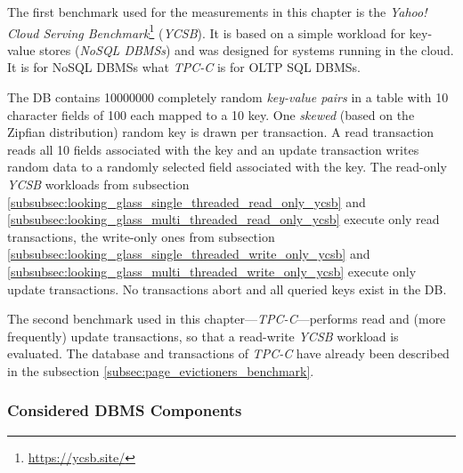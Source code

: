     The first benchmark used for the measurements in this chapter is the \emph{Yahoo! Cloud Serving Benchmark}\footnote{\url{https://ycsb.site/}} (\textit{YCSB}). It is based on a simple workload for key-value stores (\emph{NoSQL DBMSs}) and was designed for systems running in the cloud. It is for NoSQL DBMSs what \textit{TPC-C} is for OLTP SQL DBMSs.

    The DB contains \num{10000000} completely random \emph{key-value pairs} in a table with 10 character fields of \SI{100}{\byte} each mapped to a \SI{10}{\byte} key. One \emph{skewed} (based on the Zipfian distribution) random key is drawn per transaction. A read transaction reads all 10 fields associated with the key and an update transaction writes random data to a randomly selected field associated with the key. The read-only \textit{YCSB} workloads from subsection \ref{subsubsec:looking_glass_single_threaded_read_only_ycsb} and \ref{subsubsec:looking_glass_multi_threaded_read_only_ycsb} execute only read transactions, the write-only ones from subsection \ref{subsubsec:looking_glass_single_threaded_write_only_ycsb} and \ref{subsubsec:looking_glass_multi_threaded_write_only_ycsb} execute only update transactions. No transactions abort and all queried keys exist in the DB.

    The second benchmark used in this chapter---\textit{TPC-C}---performs read and (more frequently) update transactions, so that a read-write \textit{YCSB} workload is evaluated. The database and transactions of \textit{TPC-C} have already been described in the subsection \ref{subsec:page_evictioners_benchmark}.

\subsubsection{Considered DBMS Components} \label{subsubsec:looking_glass_components}

